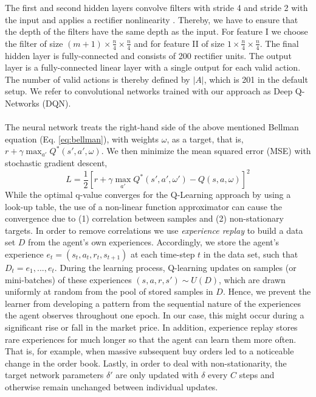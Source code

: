 The first and second hidden layers convolve filters with stride 4 and stride 2 with the input and applies a rectifier nonlinearity \cite{jarrett2009best}. 
Thereby, we have to ensure that the depth of the filters have the same depth as the input.
For feature I we choose the filter of size $(m+1) \times \frac{n}{4} \times \frac{n}{4}$ and for feature II of size $1 \times \frac{n}{4} \times \frac{n}{4}$.
The final hidden layer is fully-connected and consists of 200 rectifier units. 
The output layer is a fully-connected linear layer with a single output for each valid action. 
The number of valid actions is thereby defined by $|A|$, which is 201 in the default setup.
We refer to convolutional networks trained with our
approach as Deep Q-Networks (DQN).
\\
\\
The neural network treats the right-hand side of the above mentioned Bellman equation (Eq. \ref{eq:bellman}), with weights $\omega$, as a target, that is, $r+\gamma \max_{a'} Q^*(s',a', \omega)$.
We then minimize the mean squared error (MSE) with stochastic gradient descent,
\begin{equation}
    L=\frac{1}{2}[r+\gamma \max_{a'} Q^*(s',a', \omega') - Q(s,a,\omega)]^2
\end{equation}
While the optimal q-value converges for the Q-Learning approach by using a look-up table, the use of a non-linear function approximator can cause the convergence due to (1) correlation between samples and (2) non-stationary targets.
In order to remove correlations we use \textit{experience replay} to build a data set $D$ from the agent's own experiences.
Accordingly, we store the agent's experience $e_t=(s_t, a_t, r_t, s_{t+1})$ at each time-step $t$ in the data set, such that $D_t = {e_1, ..., e_t}$.
During the learning process, Q-learning updates on samples (or mini-batches) of these experiences $(s,a,r,s') \sim U(D)$, which are drawn uniformly at random from the pool of stored samples in $D$.
Hence, we prevent the learner from developing a pattern from the sequential nature of the experiences the agent observes throughout one epoch.
In our case, this might occur during a significant rise or fall in the market price.
In addition, experience replay stores rare experiences for much longer so that the agent can learn them more often.
That is, for example, when massive subsequent buy orders led to a noticeable change in the order book.
Lastly, in order to deal with non-stationarity, the target network parameters $\delta'$ are only updated with $\delta$ every $C$ steps and otherwise remain unchanged between individual updates.
